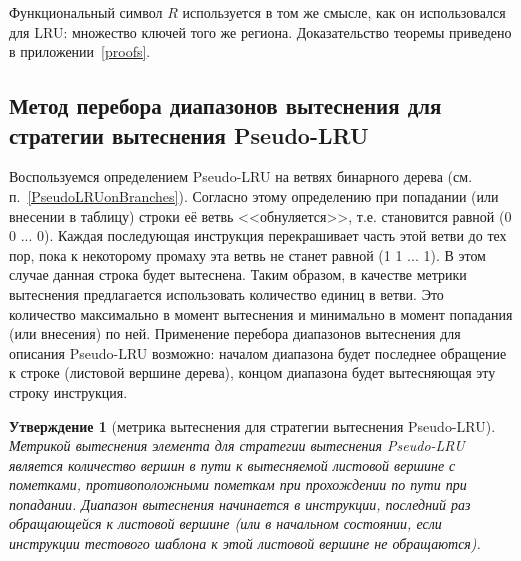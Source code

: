 \documentclass[14pt]{extreport}
\newtheorem{utv}{Утверждение}
\newcommand{\LRU}{\textsf{LRU}\xspace}
\newcommand{\FIFO}{\textsf{FIFO}\xspace}
\newcommand{\PseudoLRU}{\textsf{Pseudo-LRU}\xspace}
\begin{document}
Функциональный символ $R$ используется в том же смысле, как он использовался для
\LRU:  множество ключей того же региона. Доказательство теоремы приведено в
приложении~\ref{proofs}.

\subsection{Метод перебора диапазонов вытеснения для стратегии
вытеснения \PseudoLRU}

Воспользуемся определением \PseudoLRU на ветвях бинарного дерева
(см. п.~\ref{PseudoLRUonBranches}). Согласно этому определению при
попадании (или внесении в таблицу) строки её ветвь
<<обнуляется>>, т.е. становится равной (0 0 ... 0). Каждая
последующая инструкция перекрашивает часть этой ветви до тех пор,
пока к некоторому промаху эта ветвь не станет равной (1 1 ...
1). В этом случае данная строка будет вытеснена. Таким образом, в
качестве метрики вытеснения предлагается использовать количество
единиц в ветви. Это количество максимально в момент вытеснения и
минимально в момент попадания (или внесения) по ней.
Применение перебора диапазонов вытеснения для описания \PseudoLRU
возможно: началом диапазона будет последнее обращение к строке
(листовой вершине дерева), концом диапазона будет вытесняющая эту строку
инструкция.

\begin{utv}[метрика вытеснения для стратегии вытеснения \PseudoLRU]
Метрикой вытеснения элемента для стратегии вытеснения \PseudoLRU
является количество вершин в пути к вытесняемой листовой вершине с
пометками, противоположными пометкам при прохождении по пути при
попадании. Диапазон вытеснения начинается в инструкции,
последний раз обращающейся к листовой вершине (или в начальном
состоянии, если инструкции тестового шаблона к этой листовой вершине
не обращаются).
\end{utv}

\end{document}
